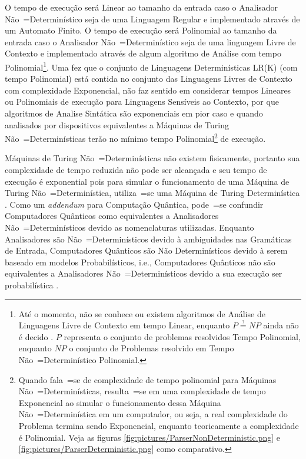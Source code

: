 {    O tempo de execução será Linear ao tamanho da entrada caso o
    Analisador Não~=Determinístico seja de uma Linguagem Regular e
    implementado através de um Automato Finito.
    O tempo de execução será Polinomial ao tamanho da entrada caso o Analisador
    Não~=Determinístico seja de uma linguagem Livre de Contexto e
    implementado através de algum algoritmo de Análise com tempo Polinomial\footnote{Até o momento,
    não se conhece ou existem algoritmos de Análise de
    Linguagens Livre de Contexto em tempo Linear,
    enquanto $P \stackrel{?}{=} NP$ ainda não é decido \cite{turingMachinesFunctions}.
    $P$ representa o conjunto de problemas resolvidos Tempo Polinomial,
    enquanto $NP$ o conjunto de Problemas resolvido em Tempo Não~=Determinístico Polinomial.}.
    Uma fez que o conjunto de Linguagens Determinísticas LR(K) (com tempo Polinomial) está
    contida no conjunto das Linguagens Livres de Contexto com complexidade Exponencial,
    não faz sentido em considerar tempos Lineares ou Polinomiais
    de execução para Linguagens Sensíveis ao Contexto,
    por que algoritmos de Analise Sintática são exponenciais
    em pior caso \cite{contextSensitiveParsing} e
    quando analisados por dispositivos equivalentes a Máquinas de Turing
    Não~=Determinísticas terão no mínimo tempo Polinomial\footnote{Quando fala~=se
    de complexidade de tempo polinomial para Máquinas Não~=Determinísticas,
    resulta~=se em uma complexidade de tempo Exponencial ao simular o
    funcionamento dessa Máquina Não~=Determinística em um computador,
    ou seja,
    a real complexidade do Problema termina sendo Exponencial,
    enquanto teoricamente a complexidade é Polinomial.
    Veja as figuras \ref{fig:pictures/ParserNonDeterministic.png} e
    \ref{fig:pictures/ParserDeterministic.png} como comparativo.} de execução.

    Máquinas de Turing Não~=Determinísticas não existem fisicamente,
    portanto sua complexidade de tempo reduzida não pode ser alcançada e
    seu tempo de execução é exponential pois para simular o
    funcionamento de uma Máquina de Turing
    Não~=Determinística,
    utiliza~=se uma Máquina de Turing Determinística \cite{turingMachinesFunctions}.
    Como um \textit{addendum} para Computação Quântica,
    pode~=se confundir Computadores Quânticos como equivalentes a Analisadores
    Não~=Determinísticos devido as nomenclaturas utilizadas.
    Enquanto Analisadores são Não~=Determinísticos devido à ambiguidades nas Gramáticas de Entrada,
    Computadores Quânticos são Não Determinísticos
    devido à serem baseado em modelos
    Probabilísticos,
    i.e.,
    Computadores Quânticos não são equivalentes a Analisadores Não~=Determinísticos devido a sua
    execução ser probabilística
    \cite{polynomialQuantumComputers,probabilisticQuantumComputation}.

}
